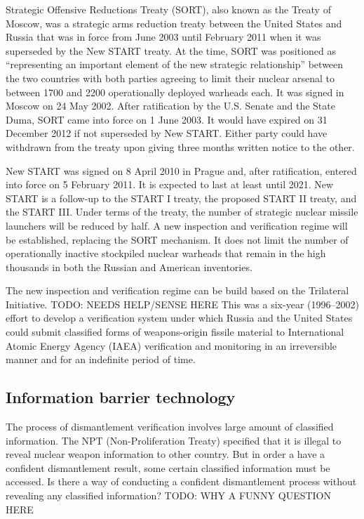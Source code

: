 \documentclass[twoside,titlepage,11pt,twocolumn,a4paper]{article}
\begin{document}
Strategic Offensive Reductions Treaty (SORT), also known as the Treaty
of Moscow, was a strategic arms reduction treaty between the United
States and Russia that was in force from June 2003 until February 2011
when it was superseded by the New START treaty. \citep{USRussia} At
the time, SORT was positioned as ``representing an important element
of the new strategic relationship'' between the two countries with
both parties agreeing to limit their nuclear arsenal to between 1700
and 2200 operationally deployed warheads each. It was signed in Moscow
on 24 May 2002. After ratification by the U.S. Senate and the State
Duma, SORT came into force on 1 June 2003. It would have expired on 31
December 2012 if not superseded by New START. Either party could have
withdrawn from the treaty upon giving three months written notice to
the other.

New START was signed on 8 April 2010 in Prague and, after
ratification, entered into force on 5 February 2011. It is expected to
last at least until 2021. \citep{USAtoday} New START is a follow-up to
the START I treaty, the proposed START II treaty, and the START
III. Under terms of the treaty, the number of strategic nuclear
missile launchers will be reduced by half. A new inspection and
verification regime will be established, replacing the SORT
mechanism. It does not limit the number of operationally inactive
stockpiled nuclear warheads that remain in the high thousands in both
the Russian and American inventories.

The new inspection and verification regime can be build based on the
Trilateral Initiative. \citep{zarimpas2003} TODO: NEEDS HELP/SENSE HERE This was a six-year
(1996--2002) effort to develop a verification system under which
Russia and the United States could submit classified forms of
weapons-origin fissile material to International Atomic Energy Agency
(IAEA) verification and monitoring in an irreversible manner and for
an indefinite period of time.

\subsection{Information barrier technology}
The process of dismantlement verification involves large amount of
classified information. The NPT (Non-Proliferation Treaty) specified
that it is illegal to reveal nuclear weapon information to other
country. But in order a have a confident dismantlement result, some
certain classified information must be accessed. Is there a way of
conducting a confident dismantlement process without revealing any
classified information? TODO: WHY A FUNNY QUESTION HERE
\end{document}

